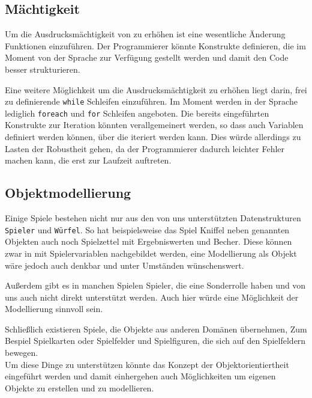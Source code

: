 \subsection{Mächtigkeit} %
\label{sub:machtigkeit}
Um die Ausdrucksmächtigkeit von \dg zu erhöhen ist eine wesentliche Änderung Funktionen einzuführen. Der Programmierer könnte Konstrukte definieren, die im Moment von der Sprache zur Verfügung gestellt werden und damit den Code besser strukturieren. 

Eine weitere Möglichkeit um die Ausdrucksmächtigkeit zu erhöhen liegt darin, frei zu definierende \texttt{while} Schleifen einzuführen. Im Moment werden in der Sprache lediglich \texttt{foreach} und \texttt{for} Schleifen angeboten. Die bereits eingeführten Konstrukte zur Iteration könnten verallgemeinert werden, so dass auch Variablen definiert werden können, über die iteriert werden kann. Dies würde allerdings zu Lasten der Robustheit gehen, da der Programmierer dadurch leichter Fehler machen kann, die erst zur Laufzeit auftreten.

\subsection{Objektmodellierung} %
\label{sub:objektmodellierung}
Einige Spiele bestehen nicht nur aus den von uns unterstützten Datenstrukturen \texttt{Spieler} und \texttt{Würfel}. So hat beispielsweise das Spiel Kniffel neben genannten Objekten auch noch Spielzettel mit Ergebniswerten und Becher. Diese können zwar in \dg mit Spielervariablen nachgebildet werden, eine Modellierung als Objekt wäre jedoch auch denkbar und unter Umständen wünschenswert.

Außerdem gibt es in manchen Spielen Spieler, die eine Sonderrolle haben und von uns auch nicht direkt unterstützt werden. Auch hier würde eine Möglichkeit der Modellierung sinnvoll sein.

Schließlich existieren Spiele, die Objekte aus anderen Domänen übernehmen, Zum Bespiel Spielkarten oder Spielfelder und Spielfiguren, die sich auf den Spielfeldern bewegen.\\

Um diese Dinge zu unterstützen könnte das Konzept der Objektorientiertheit eingeführt werden und damit einhergehen auch Möglichkeiten um eigenen Objekte zu erstellen und zu modellieren.


